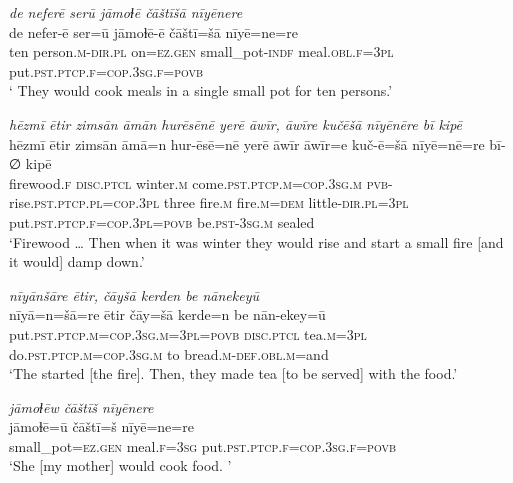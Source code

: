 \ea \label{ŽE.27}
\textit{de neferē serū jāmoɫē čāštīšā nīyēnere} \\ 
\gll de nefer-ē ser=ū jāmoɫē-ē čāštī=šā nīyē=ne=re \\ 
 ten person\textsc{.m}\textsc{-dir}\textsc{.pl} on\textsc{\textsc{=ez.gen}} small\_pot\textsc{-indf} meal\textsc{.obl}\textsc{.f}\textsc{=3pl} put\textsc{.pst}\textsc{.ptcp}\textsc{.f}\textsc{=cop}\textsc{.3sg}\textsc{.f}\textsc{=\textsc{povb}} \\ 
\glt ` They would cook meals in a single small pot for ten persons.'
\z 
 
\ea \label{ŽE.37}
\textit{hēzmī ētir zimsān āmān hurēsēnē yerē āwīr, āwīre kučēšā nīyēnēre bī kipē} \\ 
\gll hēzmī ētir zimsān āmā=n hur-ēsē=nē yerē āwīr āwīr=e kuč-ē=šā nīyē=nē=re bī-∅ kipē \\ 
 firewood\textsc{.f} \textsc{disc}.\textsc{ptcl} winter\textsc{.m} come\textsc{.pst}\textsc{.ptcp}\textsc{.m}\textsc{=cop}\textsc{.3sg}\textsc{.m} \textsc{pvb-}rise\textsc{.pst}\textsc{.ptcp}\textsc{.pl}\textsc{=cop}\textsc{.3pl} three fire\textsc{.m} fire\textsc{.m}\textsc{=dem} little\textsc{-dir}\textsc{.pl}\textsc{=3pl} put\textsc{.pst}\textsc{.ptcp}\textsc{.f}\textsc{=cop}\textsc{.3pl}\textsc{=\textsc{povb}} be\textsc{.pst}\textsc{-3sg}\textsc{.m} sealed \\ 
\glt `Firewood …  Then when it was winter they would rise and start a small fire [and it would] damp down.'
\z 
 
\ea \label{ŽE.38}
\textit{nīyānšāre ētir, čāyšā kerden be nānekeyū} \\ 
\gll nīyā=n=šā=re ētir čāy=šā kerde=n be nān-ekey=ū \\ 
 put\textsc{.pst}\textsc{.ptcp}\textsc{.m}\textsc{=cop}\textsc{.3sg}\textsc{.m}\textsc{=3pl}\textsc{=\textsc{povb}} \textsc{disc}.\textsc{ptcl} tea\textsc{.m}\textsc{=3pl} do\textsc{.pst}\textsc{.ptcp}\textsc{.m}\textsc{=cop}\textsc{.3sg}\textsc{.m} to bread\textsc{.m}\textsc{-def}\textsc{.obl}\textsc{.m}=and \\ 
\glt `The started [the fire].  Then, they made tea [to be served] with the food.'
\z 
 
\ea \label{ŽE.45}
\textit{jāmoɫēw čāštīš nīyēnere} \\ 
\gll jāmoɫē=ū čāštī=š nīyē=ne=re \\ 
 small\_pot\textsc{\textsc{=ez.gen}} meal\textsc{.f}\textsc{=3sg} put\textsc{.pst}\textsc{.ptcp}\textsc{.f}\textsc{=cop}\textsc{.3sg}\textsc{.f}\textsc{=\textsc{povb}} \\ 
\glt `She [my mother] would cook food. '
\z 
 
